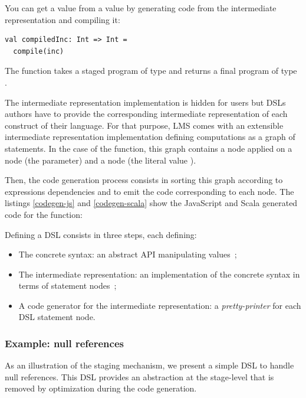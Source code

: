 \documentclass[american,english,runningheads]{llncs}
\begin{document}
You can get a  value from a  value by generating code from the intermediate representation and
compiling it:
\begin{lstlisting}
val compiledInc: Int => Int =
  compile(inc)
\end{lstlisting}
The  function takes a staged program of type  and returns a final program of
type .

The intermediate representation implementation is hidden for users but DSLs authors have to provide the corresponding
intermediate representation of each construct of their language. For that purpose, LMS comes with an extensible
intermediate representation implementation defining computations as a graph of statements. In the case of the
 function, this graph contains a  node applied on a  node (the  parameter) and
a  node (the literal value ).

Then, the code generation process consists in sorting this graph according to expressions dependencies and to emit
the code corresponding to each node. The listings \ref{codegen-js} and \ref{codegen-scala} show the JavaScript and
Scala generated code for the  function:
\begin{multicols}{2}


\end{multicols}

Defining a DSL consists in three steps, each defining:

\begin{itemize}
\item The concrete syntax: an abstract API manipulating  values~;
\item The intermediate representation: an implementation of the concrete syntax in terms of statement nodes~;
\item A code generator for the intermediate representation: a \emph{pretty-printer} for each DSL statement node.
\end{itemize}

\subsubsection{Example: null references}

As an illustration of the staging mechanism, we present a simple DSL to handle null references. This DSL provides an
abstraction at the stage-level that is removed by optimization during the code generation.
\end{document}

